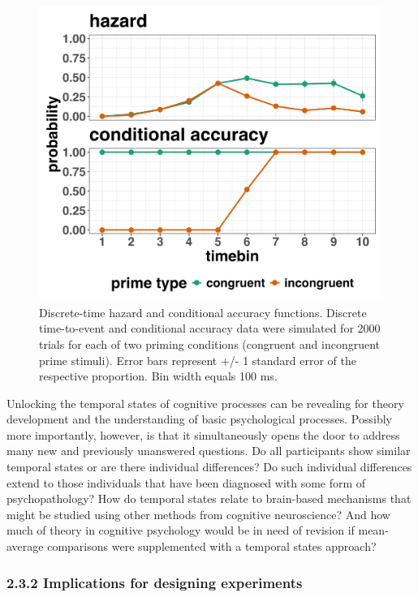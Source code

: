 \documentclass[
  man, donotrepeattitle,floatsintext]{apa6}
\begin{document}
\begin{figure}[H]

{\centering \includegraphics[width=0.8\linewidth,height=0.67\textheight,]{../sims/figures/haz_acc_single} 

}

\caption{Discrete-time hazard and conditional accuracy functions. Discrete time-to-event and conditional accuracy data were simulated for 2000 trials for each of two priming conditions (congruent and incongruent prime stimuli). Error bars represent +/- 1 standard error of the respective proportion. Bin width equals 100 ms.}\label{fig:plot3}
\end{figure}

Unlocking the temporal states of cognitive processes can be revealing for theory development and the understanding of basic psychological processes. Possibly more importantly, however, is that it simultaneously opens the door to address many new and previously unanswered questions. Do all participants show similar temporal states or are there individual differences? Do such individual differences extend to those individuals that have been diagnosed with some form of psychopathology? How do temporal states relate to brain-based mechanisms that might be studied using other methods from cognitive neuroscience? And how much of theory in cognitive psychology would be in need of revision if mean-average comparisons were supplemented with a temporal states approach?

\subsubsection{2.3.2 Implications for designing experiments}\label{implications-for-designing-experiments}
\end{document}
